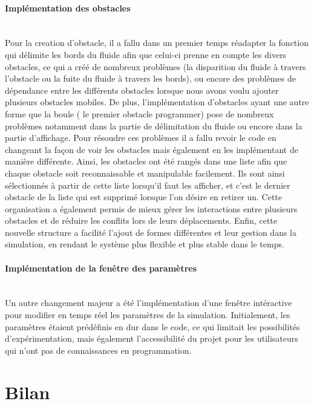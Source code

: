 \documentclass[a4paper]{article}
\begin{document}
\paragraph{Implémentation des obstacles} 
\leavevmode\\

Pour la creation d'obstacle, il a fallu dans un premier temps réadapter la fonction qui délimite les bords du fluide afin que celui-ci prenne en compte les divers obstacles, ce qui a créé de nombreux problèmes (la disparition du fluide à travers l'obstacle ou la fuite du fluide à travers les bords), ou encore des problèmes de dépendance entre les différents obstacles lorsque nous avons voulu ajouter plusieurs obstacles mobiles. De plus, l'implémentation d'obstacles ayant une autre forme que la boule ( le premier obstacle programmer) pose de nombreux problèmes notamment dans la partie de délimitation du fluide ou encore dans la partie d'affichage.
Pour résoudre ces problèmes il a fallu revoir le code en changeant la façon de voir les obstacles mais également en les implémentant de manière différente. Ainsi, les obstacles ont été rangés dans une liste afin que chaque obstacle soit reconnaissable et manipulable facilement. Ils sont ainsi sélectionnés à partir de cette liste lorsqu'il faut les afficher, et c'est le dernier obstacle de la liste qui est supprimé lorsque l'on désire en retirer un. Cette organisation a également permis de mieux gérer les interactions entre plusieurs obstacles et de réduire les conflits lors de leurs déplacements.
Enfin, cette nouvelle structure a facilité l'ajout de formes différentes et leur gestion dans la simulation, en rendant le système plus flexible et plus stable dans le temps.
 


\paragraph{Implémentation de la fenêtre des paramètres} 
\leavevmode\\

Un autre changement majeur a été l'implémentation d'une fenêtre intéractive pour modifier en temps réel les paramètres de la simulation. 
Initialement, les paramètres étaient prédéfinis en dur dans le code, ce qui limitait les possibilités d'expérimentation, mais également l'accessibilité du projet pour les utilisateurs qui n'ont pas de connaissances en programmation. 


\section{Bilan}
\end{document}
